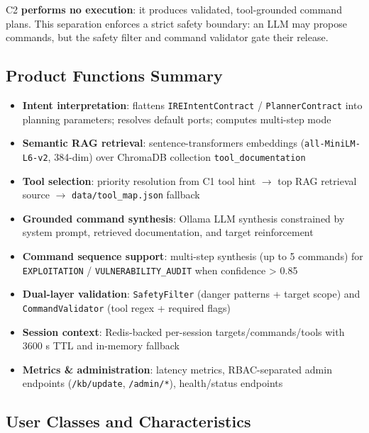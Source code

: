 \documentclass[10pt,journal,onecolumn]{IEEEtran}
\begin{document}
C2 \textbf{performs no execution}: it produces validated, tool-grounded command plans. This separation enforces a strict safety boundary: an LLM may propose commands, but the safety filter and command validator gate their release.

\subsection{Product Functions Summary}

\begin{itemize}
\item \textbf{Intent interpretation}: flattens \texttt{IREIntentContract} / \texttt{PlannerContract} into planning parameters; resolves default ports; computes multi-step mode
\item \textbf{Semantic RAG retrieval}: sentence-transformers embeddings (\texttt{all-MiniLM-L6-v2}, 384-dim) over ChromaDB collection \texttt{tool\_documentation}
\item \textbf{Tool selection}: priority resolution from C1 tool hint $\rightarrow$ top RAG retrieval source $\rightarrow$ \texttt{data/tool\_map.json} fallback
\item \textbf{Grounded command synthesis}: Ollama LLM synthesis constrained by system prompt, retrieved documentation, and target reinforcement
\item \textbf{Command sequence support}: multi-step synthesis (up to 5 commands) for \texttt{EXPLOITATION} / \texttt{VULNERABILITY\_AUDIT} when confidence > 0.85
\item \textbf{Dual-layer validation}: \texttt{SafetyFilter} (danger patterns + target scope) and \texttt{CommandValidator} (tool regex + required flags)
\item \textbf{Session context}: Redis-backed per-session targets/commands/tools with 3600 s TTL and in-memory fallback
\item \textbf{Metrics \& administration}: latency metrics, RBAC-separated admin endpoints (\texttt{/kb/update}, \texttt{/admin/*}), health/status endpoints
\end{itemize}

\subsection{User Classes and Characteristics}
\end{document}
